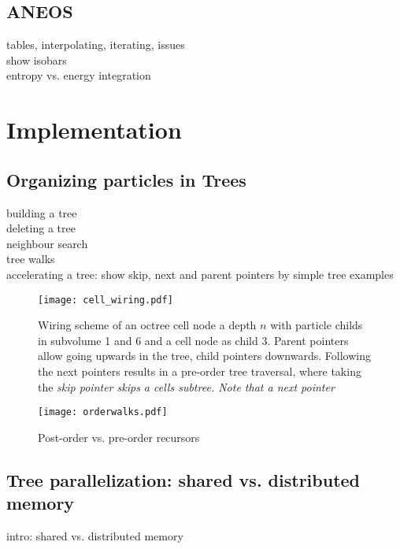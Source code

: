 \subsection{ANEOS}
tables, interpolating, iterating, issues\\
show isobars\\
entropy vs. energy integration\\

\section{Implementation}
\subsection{Organizing particles in Trees}
building a tree\\
deleting a tree\\
neighbour search\\
tree walks\\
accelerating a tree: show skip, next and parent pointers by simple tree examples\\

\begin{figure}[htbp]
\begin{center}
\texttt{[image: cell\_wiring.pdf]}
\caption{Wiring scheme of an octree cell node a depth $n$ with particle childs in subvolume 1 and 6 and a cell node as child 3. Parent pointers allow going upwards in the tree, child pointers downwards. Following the next pointers results in a pre-order tree traversal, where taking the \it{skip} pointer skips a cells subtree. Note that a \it{next} pointer }
\label{fig02walks}
\end{center}
\end{figure}


\begin{figure}[htbp]
\begin{center}
\texttt{[image: orderwalks.pdf]}
\caption{Post-order vs. pre-order recursors}
\label{fig02walks}
\end{center}
\end{figure}


\subsection{Tree parallelization: shared vs. distributed memory}
intro: shared vs. distributed memory\\

